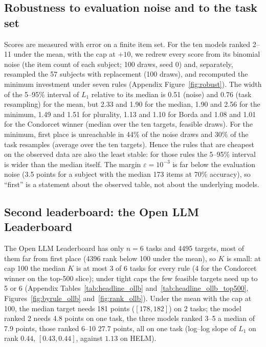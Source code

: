 \subsection{Robustness to evaluation noise and to the task set}
\label{sec:robust}
Scores are measured with error on a finite item set. For the ten models ranked 2--11 under the mean, with the cap at $+10$, we redrew every score from its binomial noise (the item count of each subject; 100 draws, seed 0) and, separately, resampled the 57 subjects with replacement (100 draws), and recomputed the minimum investment under seven rules (Appendix Figure~\ref{fig:robust}). The width of the 5--95\% interval of $L_1$ relative to its median is 0.51 (noise) and 0.76 (task resampling) for the mean, but 2.33 and 1.90 for the median, 1.90 and 2.56 for the minimum, 1.49 and 1.51 for plurality, 1.13 and 1.10 for Borda and 1.08 and 1.01 for the Condorcet winner (median over the ten targets, feasible draws). For the minimum, first place is unreachable in 44\% of the noise draws and 30\% of the task resamples (average over the ten targets). Hence the rules that are cheapest on the observed data are also the least stable: for those rules the 5--95\% interval is wider than the median itself. The margin $\varepsilon=10^{-3}$ is far below the evaluation noise (3.5 points for a subject with the median 173 items at 70\% accuracy), so ``first'' is a statement about the observed table, not about the underlying models.


\subsection{Second leaderboard: the Open LLM Leaderboard}
\label{sec:ollb}
The Open LLM Leaderboard has only $n=6$ tasks and 4495 targets, most of them far from first place (4396 rank below 100 under the mean), so $K$ is small: at cap 100 the median $K$ is at most 3 of 6 tasks for every rule (4 for the Condorcet winner on the top-500 slice); under tight caps the few feasible targets need up to 5 or 6 (Appendix Tables~\ref{tab:headline_ollb} and~\ref{tab:headline_ollb_top500}, Figures~\ref{fig:byrule_ollb} and~\ref{fig:rank_ollb}). Under the mean with the cap at 100, the median target needs 181 points ($[178,182]$) on 2 tasks; the model ranked 2 needs 4.8 points on one task, the three models ranked 3--5 a median of 7.9 points, those ranked 6--10 27.7 points, all on one task (log--log slope of $L_1$ on rank $0.44$, $[0.43,0.44]$, against $1.13$ on HELM).

